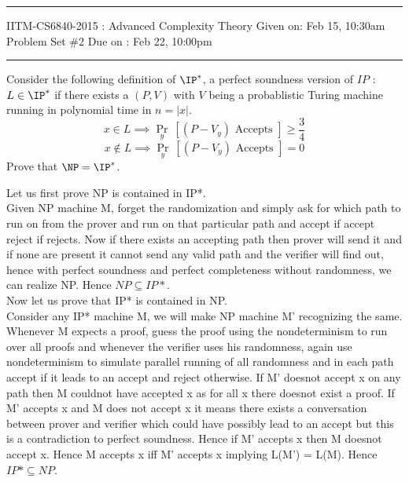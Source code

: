 \documentclass[12pt]{exam}
\begin{document}
\hrule
\vspace{3mm}
\noindent
{\sf IITM-CS6840-2015 : Advanced Complexity Theory  \hfill Given on: Feb 15, 10:30am}
\vspace{3mm} \\
\noindent
{\sf Problem Set \#2 \hfill Due on : Feb 22, 10:00pm}
\vspace{3mm}
\hrule

\begin{questions}



\question[10]
Consider the following definition of $\IP^*$, a perfect soundness version of $IP$ : $L \in \IP^*$ if there exists a $(P,V)$ with $V$ being a probablistic Turing machine running in polynomial time in $n = |x|$.
\[ x \in L \implies \Pr_y~[(P-V_y) \textrm{ Accepts }] \ge \frac{3}{4} \]
\[ x \not\in L \implies \Pr_y~[(P-V_y) \textrm{ Accepts }] = 0 \]
Prove that $\NP = \IP^*$.
\begin{solution}
Let us first prove NP is contained in IP*.\\
Given NP machine M, forget the randomization and simply
ask for which path to run on from the prover and run on that
particular path and accept if accept reject if rejects. Now if there
exists an accepting path then prover will send it and if none are present
it cannot send any valid path and the verifier will find out, hence with
perfect soundness and perfect completeness without randomness, we can
realize NP. Hence $NP \subseteq IP*$.\\

Now let us prove that IP* is contained in NP.\\
Consider any IP* machine M, we will make NP machine
M' recognizing the same. Whenever M expects a proof, guess
the proof using the nondeterminism to run over all proofs and whenever the
verifier uses his randomness, again use nondeterminism to simulate parallel
running of all randomness and in each path accept if it leads to an accept
and reject otherwise. If M' doesnot accept x on any path
then M couldnot have accepted x as for all x there doesnot exist
a proof. If M' accepts x and M does not accept x it means there exists a
conversation between prover and verifier which could have possibly lead
to an accept but this is a contradiction to perfect soundness. Hence if
M' accepts x then M doesnot accept x. Hence M accepts x iff
M' accepts x implying L(M') = L(M). Hence $IP* \subseteq NP$.\\


\end{solution}
\end{questions}
\end{document}
